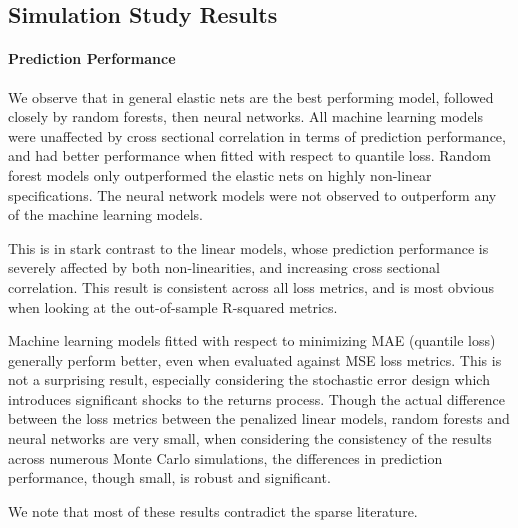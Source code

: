 \documentclass{article}
\begin{document}
\subsection{Simulation Study Results}

\paragraph{Prediction Performance}
We observe that in general elastic nets are the best performing model, followed closely by random forests, then neural networks. All machine learning models were unaffected by cross sectional correlation in terms of prediction performance, and had better performance when fitted with respect to quantile loss. Random forest models only outperformed the elastic nets on highly non-linear specifications. The neural network models were not observed to outperform any of the machine learning models. 

This is in stark contrast to the linear models, whose prediction performance is severely affected by both non-linearities, and increasing cross sectional correlation. This result is consistent across all loss metrics, and is most obvious when looking at the out-of-sample R-squared metrics.

Machine learning models fitted with respect to minimizing MAE (quantile loss) generally perform better, even when evaluated against MSE loss metrics. This is not a surprising result, especially considering the stochastic error design which introduces significant shocks to the returns process. Though the actual difference between the loss metrics between the penalized linear models, random forests and neural networks are very small, when considering the consistency of the results across numerous Monte Carlo simulations, the differences in prediction performance, though small, is robust and significant.

We note that most of these results contradict the sparse literature.

\end{document}
